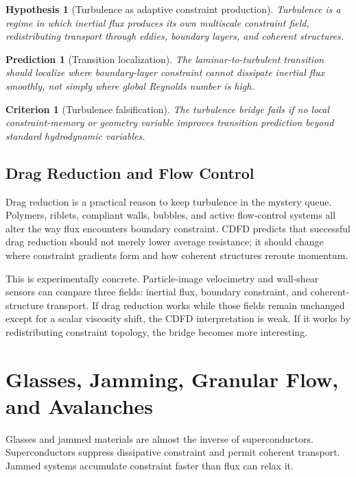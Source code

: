 \documentclass[11pt]{article}
\newtheorem{hypothesis}{Hypothesis}
\newtheorem{prediction}{Prediction}
\newtheorem{criterion}{Criterion}
\begin{document}
\begin{hypothesis}[Turbulence as adaptive constraint production]
Turbulence is a regime in which inertial flux produces its own multiscale constraint field, redistributing transport through eddies, boundary layers, and coherent structures.
\end{hypothesis}

\begin{prediction}[Transition localization]
The laminar-to-turbulent transition should localize where boundary-layer constraint cannot dissipate inertial flux smoothly, not simply where global Reynolds number is high.
\end{prediction}

\begin{criterion}[Turbulence falsification]
The turbulence bridge fails if no local constraint-memory or geometry variable improves transition prediction beyond standard hydrodynamic variables.
\end{criterion}

\subsection{Drag Reduction and Flow Control}

Drag reduction is a practical reason to keep turbulence in the mystery queue. Polymers, riblets, compliant walls, bubbles, and active flow-control systems all alter the way flux encounters boundary constraint. CDFD predicts that successful drag reduction should not merely lower average resistance; it should change where constraint gradients form and how coherent structures reroute momentum.

This is experimentally concrete. Particle-image velocimetry and wall-shear sensors can compare three fields: inertial flux, boundary constraint, and coherent-structure transport. If drag reduction works while those fields remain unchanged except for a scalar viscosity shift, the CDFD interpretation is weak. If it works by redistributing constraint topology, the bridge becomes more interesting.

\section{Glasses, Jamming, Granular Flow, and Avalanches}

Glasses and jammed materials are almost the inverse of superconductors. Superconductors suppress dissipative constraint and permit coherent transport. Jammed systems accumulate constraint faster than flux can relax it.
\end{document}
